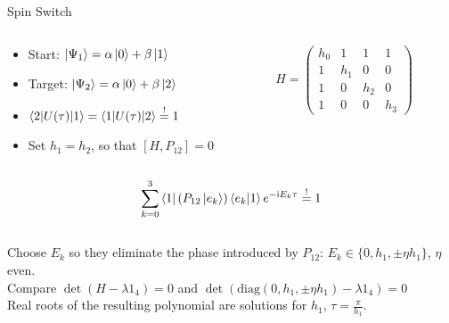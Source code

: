 \documentclass{beamer}
\newcommand{\mbeq}{\overset{!}{=}}
\begin{document}
\begin{frame}{Spin Switch}
	\begin{columns}[T]
		\begin{column}{0.6\textwidth}
   			\centering
   			\begin{itemize}
   				\item Start: $\ket{\Psi_1} = \alpha \ket{0} + \beta \ket{1}$
   				\item Target: $\ket{\Psi_2} = \alpha \ket{0} + \beta \ket{2}$
   				\item $\braket{2|U(\tau)|1} = \braket{1|U(\tau)|2} \mbeq 1$
   				\item Set $h_1 = h_2$, so that $\left[H,P_{12}\right]=0$ 
   			\end{itemize}
		\end{column}
		\begin{column}{0.4\textwidth}
			\centering
    		$H = \begin{pmatrix}
			h_0 & 1 & 1 & 1 \\
			1 & h_1 & 0 & 0 \\
			1 & 0 & h_2 & 0 \\
			1 & 0 & 0 & h_3
\end{pmatrix}$
		\end{column}
	\end{columns}
	\[\sum_{k=0}^3\bra{1}(P_{12}\ket{e_k})\braket{e_k|1}e^{-\text{i}E_k\tau} \mbeq 1\]\\
   			Choose $E_k$ so they eliminate the phase introduced by $P_{12}$: $E_k \in \{0,h_1,\pm\eta h_1\}$, $\eta$ even.\\
   			Compare $\det(H-\lambda\text{1}_4) = 0$ and $\det(\text{diag}(0,h_1,\pm\eta h_1)-\lambda\text{1}_4) = 0$\\
   			Real roots of the resulting polynomial are solutions for $h_1$, $\tau = \frac{\pi}{h_1}$.
\end{frame}
\end{document}
